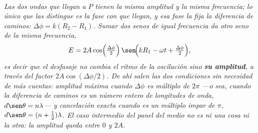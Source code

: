 \begin{center}
\begin{tikzpicture}
\end{tikzpicture}\\[0.5em]
{\small\itshape Las dos ondas que llegan a $P$ tienen la misma amplitud y la
misma frecuencia; lo único que las distingue es la fase con que llegan, y esa
fase la fija la diferencia de caminos: $\Delta\phi = k(R_2-R_1)$. Sumar dos
senos de igual frecuencia da otro seno de la misma frecuencia,
\[
E = 2A\cos\!\Big(\tfrac{\Delta\phi}{2}\Big)\,
     \sen\!\Big(kR_1 - \omega t + \tfrac{\Delta\phi}{2}\Big),
\]
es decir que el desfasaje no cambia el ritmo de la oscilación sino
\textbf{su amplitud}, a través del factor $2A\cos(\Delta\phi/2)$. De ahí salen
las dos condiciones sin necesidad de más cuentas: amplitud máxima cuando
$\Delta\phi$ es múltiplo de $2\pi$ ---o sea, cuando la diferencia de caminos es
un número entero de longitudes de onda, $d\sen\theta = n\lambda$--- y
cancelación exacta cuando es un múltiplo impar de $\pi$, $d\sen\theta =
(n+\tfrac12)\lambda$. El caso intermedio del panel del medio no es ni una cosa
ni la otra: la amplitud queda entre $0$ y $2A$.}
\end{center}
